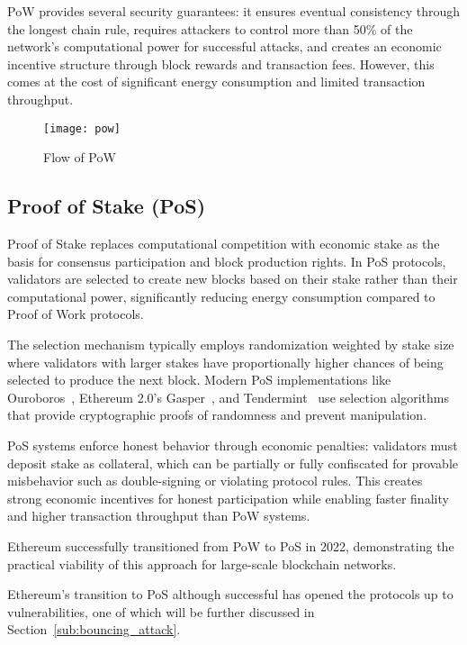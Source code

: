 PoW provides several security guarantees: it ensures eventual consistency through
the longest chain rule, requires attackers to control more than 50\% of the network's
computational power for successful attacks, and creates an economic incentive structure
through block rewards and transaction fees. However, this comes at the cost of
significant energy consumption and limited transaction throughput.

\begin{figure}[h]
	\centering
	\texttt{[image: pow]}
	\caption{Flow of PoW}
	\label{fig:pow}
\end{figure}

\subsection{Proof of Stake (PoS)}\label{sub:pos}

Proof of Stake replaces computational competition with economic stake as the basis
for consensus participation and block production rights. In PoS protocols, validators
are selected to create new blocks based on their stake rather than their
computational power, significantly reducing energy consumption compared to Proof of Work protocols.

The selection mechanism typically employs randomization weighted by stake size where
validators with larger stakes have proportionally higher chances of being selected
to produce the next block. Modern PoS implementations like Ouroboros~\cite{ouroboros},
Ethereum 2.0's Gasper~\cite{gasper}, and Tendermint~\cite{tendermint} use selection algorithms
that provide cryptographic proofs of randomness and prevent manipulation.

PoS systems enforce honest behavior through economic penalties: validators must
deposit stake as collateral, which can be partially or fully confiscated
for provable misbehavior such as double-signing or violating protocol rules.
This creates strong economic incentives for honest participation while enabling
faster finality and higher transaction throughput than PoW systems.

Ethereum successfully transitioned from PoW to PoS in 2022, demonstrating the
practical viability of this approach for large-scale blockchain networks. 

Ethereum's transition to PoS although successful has opened the protocols up to vulnerabilities,
one of which will be further discussed in Section~\ref{sub:bouncing_attack}.

